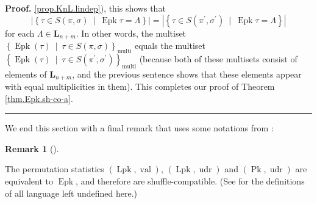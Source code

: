 \documentclass[numbers=enddot,12pt,final,onecolumn,notitlepage]{scrartcl}%
\theoremstyle{definition}
\newtheorem{remk}[theo]{Remark}
\newenvironment{remark}[1][]
{\begin{remk}[#1]\begin{leftbar}}
{\end{leftbar}\end{remk}}
\newenvironment{proof}[1][Proof]{\noindent\textbf{#1.} }{\ \rule{0.5em}{0.5em}}
\begin{document}
\begin{proof}
\ref{prop.KnL.lindep}), this shows that%
\[
\left\vert \left\{  \tau\in S\left(  \pi,\sigma\right)  \ \mid
\ \operatorname*{Epk}\tau=\Lambda\right\}  \right\vert =\left\vert \left\{
\tau\in S\left(  \pi^{\prime},\sigma^{\prime}\right)  \ \mid
\ \operatorname*{Epk}\tau=\Lambda\right\}  \right\vert
\]
for each $\Lambda\in\mathbf{L}_{n+m}$. In other words, the multiset $\left\{
\operatorname*{Epk}\left(  \tau\right)  \ \mid\ \tau\in S\left(  \pi
,\sigma\right)  \right\}  _{\operatorname*{multi}}$ equals the multiset
$\left\{  \operatorname*{Epk}\left(  \tau\right)  \ \mid\ \tau\in S\left(
\pi^{\prime},\sigma^{\prime}\right)  \right\}  _{\operatorname*{multi}}$
(because both of these multisets consist of elements of $\mathbf{L}_{n+m}$,
and the previous sentence shows that these elements appear with equal
multiplicities in them). This completes our proof of Theorem
\ref{thm.Epk.sh-co-a}.
\end{proof}

We end this section with a final remark that uses some notations from
\cite{part1}:

\begin{remark}
\label{rmk.Epk.equivalents}The permutation statistics $\left(
\operatorname*{Lpk},\operatorname*{val}\right)  $, $\left(
\operatorname*{Lpk},\operatorname*{udr}\right)  $ and $\left(
\operatorname*{Pk},\operatorname*{udr}\right)  $ are equivalent to
$\operatorname*{Epk}$, and therefore are shuffle-compatible. (See \cite{part1}
for the definitions of all language left undefined here.)
\end{remark}
\end{document}
